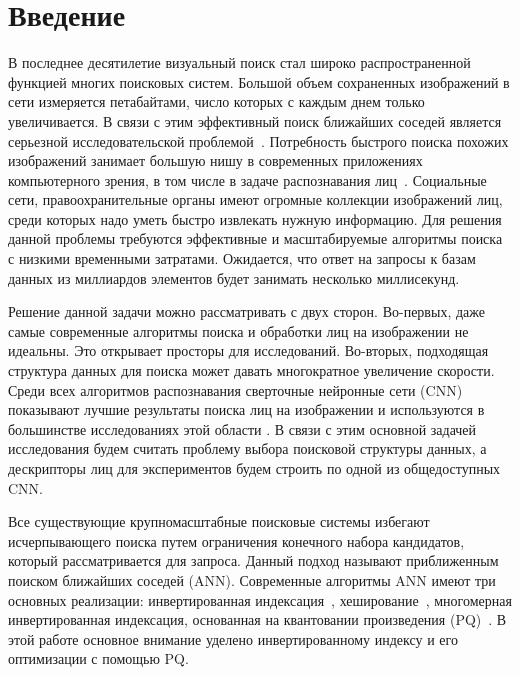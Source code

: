 \section*{Введение}
\label{sec:Chapter0} 


В последнее десятилетие визуальный поиск стал широко распространенной функцией многих поисковых систем. Большой объем сохраненных изображений в сети измеряется петабайтами, число которых с каждым днем только увеличивается. В связи с этим эффективный поиск ближайших соседей является серьезной исследовательской проблемой~\cite{1,2,3,4,5,6}. Потребность быстрого поиска похожих изображений занимает большую нишу в современных приложениях компьютерного зрения, в том числе в задаче распознавания лиц~\cite{8}. Социальные сети, правоохранительные органы имеют огромные коллекции изображений лиц, среди которых надо уметь быстро извлекать нужную информацию. Для решения данной проблемы требуются эффективные и масштабируемые алгоритмы поиска с низкими временными затратами. Ожидается, что ответ на запросы к базам данных из миллиардов элементов будет занимать несколько миллисекунд.

Решение данной задачи можно рассматривать с двух сторон. Во-первых, даже самые современные алгоритмы поиска и обработки лиц на изображении не идеальны. Это открывает просторы для исследований. Во-вторых, подходящая структура данных для поиска может давать многократное увеличение скорости. Среди всех алгоритмов распознавания сверточные нейронные сети (CNN) показывают лучшие результаты поиска лиц на изображении и используются в большинстве исследованиях этой области \cite{8,10}. В связи с этим основной задачей исследования будем считать проблему выбора поисковой структуры данных, а дескрипторы лиц для экспериментов будем строить по одной из общедоступных CNN. 

Все существующие крупномасштабные поисковые системы избегают исчерпывающего поиска путем ограничения конечного набора кандидатов, который рассматривается для запроса. Данный подход называют приближенным поиском ближайших соседей (ANN). Современные алгоритмы ANN имеют три основных реализации: инвертированная индексация~\cite{1,2,3,4,5,6}, хеширование~\cite{9}, многомерная инвертированная индексация, основанная на квантовании произведения (PQ)~\cite{4,5}. В этой работе основное внимание уделено инвертированному индексу и его оптимизации с помощью PQ.

